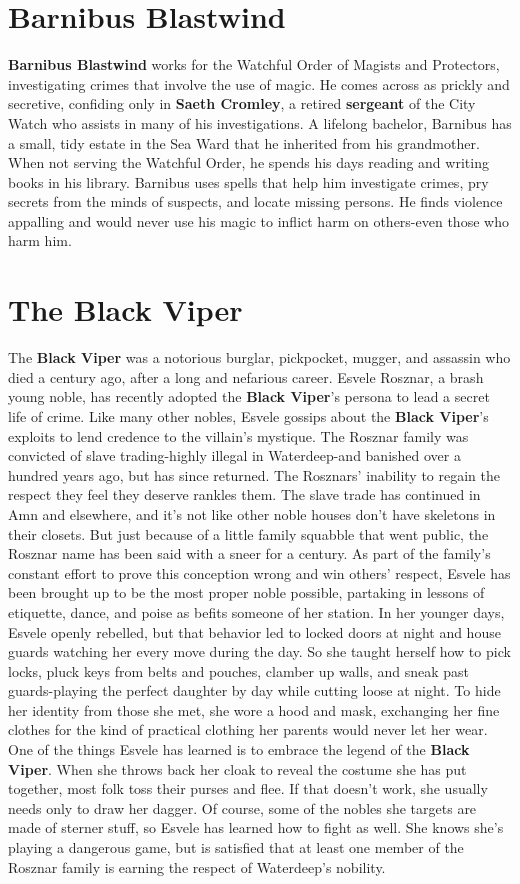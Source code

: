 \documentclass[10pt,a4paper,twoside,twocolumn,openany,nodeprecatedcode]{dndbook}
\begin{document}
\section{Barnibus Blastwind}
\textbf{Barnibus Blastwind} works for the Watchful Order of Magists and  Protectors, investigating crimes that involve the use of  magic. He comes across as prickly and secretive, confiding only in \textbf{Saeth Cromley}, a retired \textbf{sergeant} of the City  Watch who assists in many of his investigations.
A lifelong bachelor, Barnibus has a small, tidy estate  in the Sea Ward that he inherited from his grandmother.  When not serving the Watchful Order, he spends his  days reading and writing books in his library.
Barnibus uses spells that help him investigate crimes,  pry secrets from the minds of suspects, and locate  missing persons. He finds violence appalling and would  never use his magic to inflict harm on others-even  those who harm him.
\section{The Black Viper}
The \textbf{Black Viper} was a notorious burglar, pickpocket, mugger, and assassin who died a century ago, after a long and nefarious career. Esvele Rosznar, a brash young noble, has recently adopted the \textbf{Black Viper}'s persona to lead a secret life of crime. Like many other nobles, Esvele gossips about the \textbf{Black Viper}'s exploits to lend credence to the villain's mystique.
The Rosznar family was convicted of slave trading-highly illegal in Waterdeep-and banished over a hundred years ago, but has since returned. The Rosznars' inability to regain the respect they feel they deserve rankles them. The slave trade has continued in Amn and elsewhere, and it's not like other noble houses don't have skeletons in their closets. But just because of a little family squabble that went public, the Rosznar name has been said with a sneer for a century. As part of the family's constant effort to prove this conception wrong and win others' respect, Esvele has been brought up to be the most proper noble possible, partaking in lessons of etiquette, dance, and poise as befits someone of her station.
In her younger days, Esvele openly rebelled, but that behavior led to locked doors at night and house guards watching her every move during the day.
So she taught herself how to pick locks, pluck keys from belts and pouches, clamber up walls, and sneak past guards-playing the perfect daughter by day while cutting loose at night. To hide her identity from those she met, she wore a hood and mask, exchanging her fine clothes for the kind of practical clothing her parents would never let her wear.
One of the things Esvele has learned is to embrace the legend of the \textbf{Black Viper}. When she throws back her cloak to reveal the costume she has put together, most folk toss their purses and flee. If that doesn't work, she usually needs only to draw her dagger. Of course, some of the nobles she targets are made of sterner stuff, so Esvele has learned how to fight as well. She knows she's playing a dangerous game, but is satisfied that at least one member of the Rosznar family is earning the respect of Waterdeep's nobility.
\end{document}
